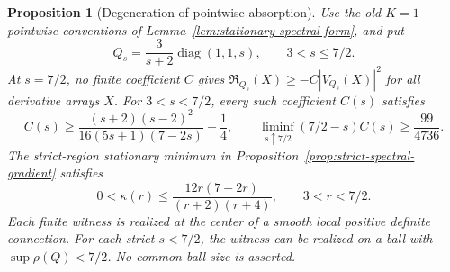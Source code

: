 \documentclass[11pt]{article}
\numberwithin{equation}{section}
\newtheorem{proposition}[theorem]{Proposition}
\theoremstyle{definition}
\theoremstyle{remark}
\begin{document}
\begin{proposition}[Degeneration of pointwise absorption]
\label{prop:spectral-absorption-limit}
Use the old $K=1$ pointwise conventions of
Lemma~\ref{lem:stationary-spectral-form}, and put
\[
 Q_s=\frac{3}{s+2}\operatorname{diag}(1,1,s),\qquad 3<s\le7/2.
\]
At $s=7/2$, no finite coefficient $C$ gives
$\mathfrak R_{Q_s}(X)\ge-C|V_{Q_s}(X)|^2$ for all derivative
arrays $X$. For $3<s<7/2$, every such coefficient $C(s)$ satisfies
\begin{equation}\label{eq:spectral-absorption-lower}
 C(s)\ge
 \frac{(s+2)(s-2)^2}{16(5s+1)(7-2s)}-\frac14,
 \qquad
 \liminf_{s\uparrow7/2}(7/2-s)C(s)\ge\frac{99}{4736}.
\end{equation}
The strict-region stationary minimum in
Proposition~\ref{prop:strict-spectral-gradient} satisfies
\begin{equation}\label{eq:spectral-kappa-upper}
 0<\kappa(r)\le\frac{12r(7-2r)}{(r+2)(r+4)},
 \qquad 3<r<7/2.
\end{equation}
Each finite witness is realized at the center of a smooth local
positive definite connection. For each strict $s<7/2$, the
witness can be realized on a ball with $\sup\rho(Q)<7/2$.
No common ball size is asserted.
\end{proposition}
\end{document}
